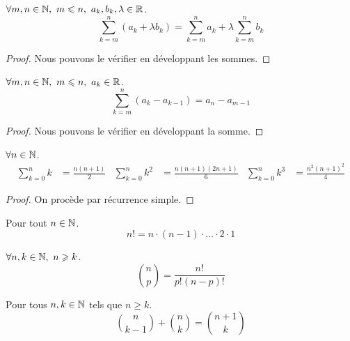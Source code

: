 \begin{proposition}
    $\forall m, n \in \mathbb{N},\ m \leqslant n,\ a_k, b_k, \lambda \in \mathbb{R}$.
    \[ \sum_{k = m}^{n} (a_k + \lambda b_k) = \sum_{k = m}^n a_k + \lambda \sum_{k = m}^n b_k \]
\end{proposition}

\begin{proof}
	Nous pouvons le vérifier en développant les sommes.
\end{proof}

\begin{proposition}
    $\forall m, n \in \mathbb{N},\ m \leqslant n,\ a_k \in \mathbb{R}$.
    \[ \sum_{k = m}^n (a_k - a_{k - 1}) = a_n - a_{m - 1} \]
\end{proposition}

\begin{proof}
	Nous pouvons le vérifier en développant la somme.
\end{proof}

\begin{proposition}
	$\forall n \in \mathbb{N}$.
	\begin{align*}
		\sum_{k = 0}^{n} k &= \frac{n(n+1)}{2} & 
		\sum_{k = 0}^{n} k^2 &= \frac{n(n+1)(2n+1)}{6} &
		\sum_{k = 0}^{n} k^3 &= \frac{n^2(n+1)^2}{4}
	\end{align*}
\end{proposition}

\begin{proof}
	On procède par récurrence simple.
\end{proof}

\begin{definition}
	Pour tout $n \in \mathbb{N}$.
	\[ n! = n \cdot (n - 1) \cdot \ldots \cdot 2 \cdot 1 \]
\end{definition}

\begin{proposition}
	$\forall n, k \in \mathbb{N},\ n \geqslant k$.
	\[ \binom{n}{p} = \frac{n!}{p!(n - p)!} \]
\end{proposition}

\begin{proposition}
	Pour tous $n, k \in \mathbb{N}$ tels que $n \geq k$.
	\[
	\binom{n}{k - 1} + \binom{n}{k} = \binom{n+1}{k}
	\]
\end{proposition}

